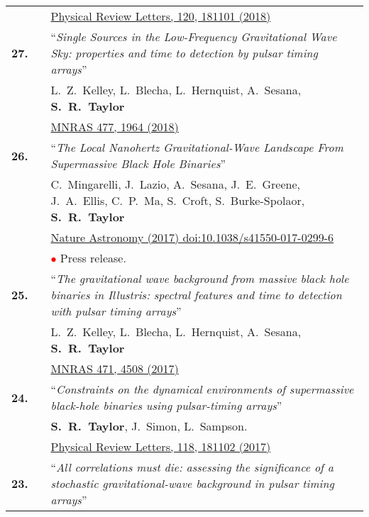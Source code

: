 \documentclass[11pt,letterpaper,sans]{moderncv}
\begin{document}
{\begin{longtable}{rp{0.3cm}p{15.8cm}}
&& \href{https://journals.aps.org/prl/abstract/10.1103/PhysRevLett.120.181101}{{\color{color1} Physical Review Letters, 120, 181101 (2018)}}  \vspace{0.09cm}\\
\textbf{27.} & & ``\textit{Single Sources in the Low-Frequency Gravitational Wave Sky: properties and time to detection by pulsar timing arrays}'' \\ 
&&L.~Z.~Kelley, L.~Blecha, L.~Hernquist, A.~Sesana, \textbf{S.~R.~Taylor} \\
&& \href{https://academic.oup.com/mnras/article-abstract/477/1/964/4937809?redirectedFrom=fulltext}{{\color{color1} MNRAS 477, 1964 (2018)}}  \vspace{0.09cm}\\
\textbf{26.} & & ``\textit{The Local Nanohertz Gravitational-Wave Landscape From Supermassive Black Hole Binaries}'' \\ 
&&C.~Mingarelli, J.~Lazio, A.~Sesana, J.~E.~Greene, J.~A.~Ellis, C.~P.~Ma, S.~Croft, S.~Burke-Spolaor, \textbf{S.~R.~Taylor} \\
&& \href{https://www.nature.com/articles/s41550-017-0299-6}{{\color{color1} Nature Astronomy (2017)
doi:10.1038/s41550-017-0299-6}} \\
&& \textcolor{red}{$\bullet$} Press release. \vspace{0.09cm}\\
\textbf{25.} & & ``\textit{The gravitational wave background from massive black hole binaries in Illustris: spectral features and time to detection with pulsar timing arrays}'' \\ 
&& L.~Z.~Kelley, L.~Blecha, L.~Hernquist, A.~Sesana, \textbf{S.~R.~Taylor} \\ 
&& \href{https://academic.oup.com/mnras/article/471/4/4508/3899130/The-gravitational-wave-background-from-massive}{{\color{color1} MNRAS 471, 4508 (2017)}} \vspace{0.09cm}\\
\textbf{24.} & & ``\textit{Constraints on the dynamical environments of supermassive black-hole binaries using pulsar-timing arrays}'' \\ 
&& \textbf{S.~R.~Taylor}, J.~Simon, L.~Sampson. \\
&& \href{https://journals.aps.org/prl/abstract/10.1103/PhysRevLett.118.181102}{{\color{color1} Physical Review Letters, 118, 181102 (2017)}} \vspace{0.09cm}\\
\textbf{23.} & & ``\textit{All correlations must die: assessing the significance of a stochastic gravitational-wave background in pulsar timing arrays}'' \\ 

\end{longtable}}
\end{document}
